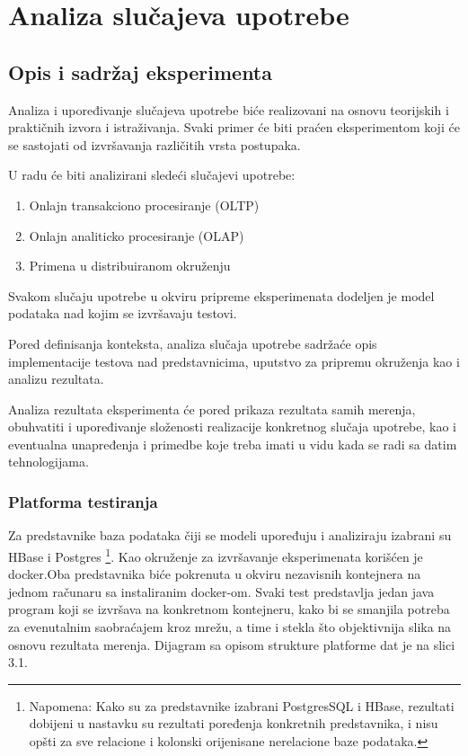 \documentclass[12pt,oneside]{memoir}
\begin{document}
\chapter{Analiza slučajeva upotrebe}
\section{Opis i sadržaj eksperimenta}
Analiza i upoređivanje slučajeva upotrebe biće realizovani na osnovu teorijskih i praktičnih  izvora i istraživanja. Svaki primer će biti praćen eksperimentom koji će se sastojati od izvršavanja različitih vrsta postupaka.

U radu će biti analizirani sledeći slučajevi upotrebe:
\begin{enumerate}
\item Onlajn transakciono procesiranje (OLTP)
\item Onlajn analiticko procesiranje (OLAP)
\item Primena u distribuiranom okruženju
\end{enumerate}

Svakom slučaju upotrebe u okviru pripreme eksperimenata dodeljen je model podataka nad kojim se izvršavaju testovi.

Pored definisanja konteksta, analiza slučaja upotrebe sadržaće opis implementacije testova nad predstavnicima, uputstvo za pripremu okruženja kao i analizu rezultata.

Analiza rezultata eksperimenta će pored prikaza rezultata samih merenja, obuhvatiti i upoređivanje složenosti realizacije konkretnog slučaja upotrebe, kao i eventualna unapređenja i primedbe koje treba imati u vidu kada se radi sa datim tehnologijama. 

\subsection{Platforma testiranja}

Za predstavnike baza podataka čiji se modeli upoređuju i analiziraju izabrani su HBase i Postgres \footnote{Napomena: Kako su za predstavnike izabrani PostgresSQL i HBase, rezultati dobijeni u nastavku su rezultati poređenja konkretnih predstavnika, i nisu opšti za sve relacione i kolonski orijenisane nerelacione baze podataka.}.  Kao okruženje za izvršavanje eksperimenata korišćen je docker.Oba  predstavnika biće pokrenuta u okviru nezavisnih kontejnera na jednom računaru sa instaliranim docker-om. Svaki test predstavlja jedan java program koji se izvršava na konkretnom kontejneru, kako bi se smanjila potreba za evenutalnim saobraćajem kroz mrežu, a time i stekla što objektivnija slika na osnovu rezultata merenja. Dijagram sa opisom strukture platforme dat je na slici 3.1.
\end{document}
